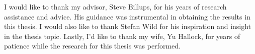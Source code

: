 I would like to thank my advisor, Steve Billups, for his years of research assistance and advice. 
His guidance was instrumental in obtaining the results in this thesis. 
I would also like to thank Stefan Wild for his inspiration and insight in the thesis topic. 
Lastly, I'd like to thank my wife, Yu Hallock, for years of patience while the research for this thesis was performed.  
